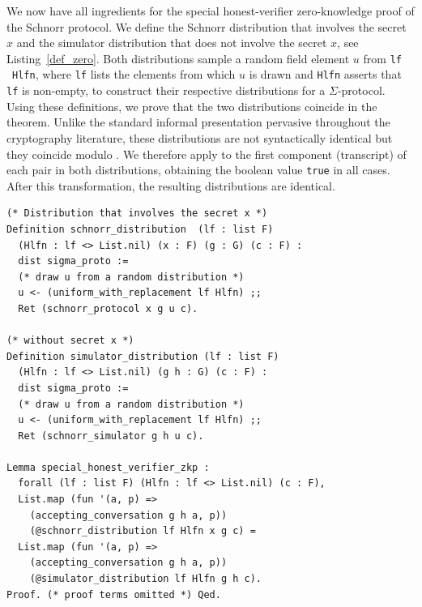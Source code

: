 \documentclass[sigconf, anonymous]{acmart}
\begin{document}
  
We now have all ingredients for the special honest-verifier zero-knowledge proof of the Schnorr protocol. We define the 
Schnorr distribution \texttt{}
that involves the secret $x$ and 
the simulator distribution \texttt{}
that does not involve the secret $x$, see Listing~\ref{def_zero}. 
Both distributions sample a random field element $u$ from 
\texttt{} \texttt{lf} \ \texttt{Hlfn}, 
where \texttt{lf} lists the elements from which $u$ is drawn and 
\texttt{Hlfn} asserts that \texttt{lf} is non-empty, 
to construct their respective distributions for a $\Sigma$-protocol.
Using these definitions, we prove that the two distributions coincide in the 
\texttt{} theorem. Unlike the standard informal 
presentation pervasive throughout the cryptography literature, these distributions 
are not syntactically identical but they coincide modulo 
\texttt{}. We therefore apply \texttt{} 
to the first component (transcript) of each pair in both distributions, obtaining 
the boolean value \texttt{true} in all cases. After this transformation, the 
resulting distributions are identical.


\begin{lstlisting}[frame=single, language=Coq, caption={Special Honest-Verifier Zero-Knowledge Proof},
  label={def_zero},captionpos=t, basicstyle=\ttfamily\footnotesize,
  abovecaptionskip=-\medskipamount]
(* Distribution that involves the secret x *)
Definition schnorr_distribution  (lf : list F) 
  (Hlfn : lf <> List.nil) (x : F) (g : G) (c : F) : 
  dist sigma_proto :=
  (* draw u from a random distribution *)
  u <- (uniform_with_replacement lf Hlfn) ;;
  Ret (schnorr_protocol x g u c).

(* without secret x *)
Definition simulator_distribution (lf : list F) 
  (Hlfn : lf <> List.nil) (g h : G) (c : F) : 
  dist sigma_proto :=
  (* draw u from a random distribution *)
  u <- (uniform_with_replacement lf Hlfn) ;;
  Ret (schnorr_simulator g h u c).
  
Lemma special_honest_verifier_zkp : 
  forall (lf : list F) (Hlfn : lf <> List.nil) (c : F), 
  List.map (fun '(a, p) => 
    (accepting_conversation g h a, p))
    (@schnorr_distribution lf Hlfn x g c) = 
  List.map (fun '(a, p) => 
    (accepting_conversation g h a, p))
    (@simulator_distribution lf Hlfn g h c).
Proof. (* proof terms omitted *) Qed. 
\end{lstlisting}
\end{document}
